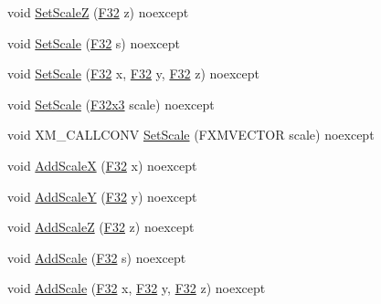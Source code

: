 \begin{DoxyCompactItemize}
\item 
void \mbox{\hyperlink{classmage_1_1_local_transform_a076673ed934cc2b92febfd5477e81e75}{Set\+ScaleZ}} (\mbox{\hyperlink{namespacemage_aa97e833b45f06d60a0a9c4fc22ae02c0}{F32}} z) noexcept
\item 
void \mbox{\hyperlink{classmage_1_1_local_transform_ae5940b8381188b25b164322d0c848fb3}{Set\+Scale}} (\mbox{\hyperlink{namespacemage_aa97e833b45f06d60a0a9c4fc22ae02c0}{F32}} s) noexcept
\item 
void \mbox{\hyperlink{classmage_1_1_local_transform_a81b531b924652a52a49a5163ee5f6685}{Set\+Scale}} (\mbox{\hyperlink{namespacemage_aa97e833b45f06d60a0a9c4fc22ae02c0}{F32}} x, \mbox{\hyperlink{namespacemage_aa97e833b45f06d60a0a9c4fc22ae02c0}{F32}} y, \mbox{\hyperlink{namespacemage_aa97e833b45f06d60a0a9c4fc22ae02c0}{F32}} z) noexcept
\item 
void \mbox{\hyperlink{classmage_1_1_local_transform_a8e489c87ad55a7a39a5ec72cc878700b}{Set\+Scale}} (\mbox{\hyperlink{namespacemage_a0fef5ab4e073c2d9ea876fefa3da4233}{F32x3}} scale) noexcept
\item 
void X\+M\+\_\+\+C\+A\+L\+L\+C\+O\+NV \mbox{\hyperlink{classmage_1_1_local_transform_a2f8086f72f3c72a641db1b59e8b3e9c0}{Set\+Scale}} (F\+X\+M\+V\+E\+C\+T\+OR scale) noexcept
\item 
void \mbox{\hyperlink{classmage_1_1_local_transform_a5b3bdbe95a1b531271a122d1fe26f0a6}{Add\+ScaleX}} (\mbox{\hyperlink{namespacemage_aa97e833b45f06d60a0a9c4fc22ae02c0}{F32}} x) noexcept
\item 
void \mbox{\hyperlink{classmage_1_1_local_transform_abd8826a904947b5934ba6afef3b3826f}{Add\+ScaleY}} (\mbox{\hyperlink{namespacemage_aa97e833b45f06d60a0a9c4fc22ae02c0}{F32}} y) noexcept
\item 
void \mbox{\hyperlink{classmage_1_1_local_transform_a28160bebf308eec45d9649a197d91336}{Add\+ScaleZ}} (\mbox{\hyperlink{namespacemage_aa97e833b45f06d60a0a9c4fc22ae02c0}{F32}} z) noexcept
\item 
void \mbox{\hyperlink{classmage_1_1_local_transform_a7c7c84c097157d87bcd3c1d58fc6f8df}{Add\+Scale}} (\mbox{\hyperlink{namespacemage_aa97e833b45f06d60a0a9c4fc22ae02c0}{F32}} s) noexcept
\item 
void \mbox{\hyperlink{classmage_1_1_local_transform_a8de03038d4455846983ccf5b7a0cb08d}{Add\+Scale}} (\mbox{\hyperlink{namespacemage_aa97e833b45f06d60a0a9c4fc22ae02c0}{F32}} x, \mbox{\hyperlink{namespacemage_aa97e833b45f06d60a0a9c4fc22ae02c0}{F32}} y, \mbox{\hyperlink{namespacemage_aa97e833b45f06d60a0a9c4fc22ae02c0}{F32}} z) noexcept

\end{DoxyCompactItemize}
